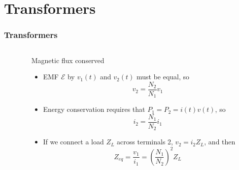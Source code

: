\documentclass[beamer]{standalone}
\begin{document}
\section{Transformers}
\begin{frame}
 \frametitle{Transformers}
 \begin{columns}
  \begin{column}{0.4\textwidth}
    \\
  \end{column}
  \begin{column}{0.6\textwidth}
   \begin{block}{Magnetic flux conserved}
    \begin{itemize}
     \item EMF $\mathcal{E}$ by $v_1(t)$ and $v_2(t)$ must be equal, so
      \begin{equation*}
       v_2 = \frac{N_2}{N_1} v_1
      \end{equation*}
     \item Energy conservation requires that $P_1 = P_2 = i(t) v(t)$, so
      \begin{equation*}
       i_2 = \frac{N_1}{N_2} i_1
      \end{equation*}
     \item If we connect a load $Z_L$ across terminals 2, $v_2 = i_2 Z_L$, and then
      \begin{equation*}
       Z_{eq} = \frac{v_1}{i_1} = \left(\frac{N_1}{N_2}\right)^2 Z_L
      \end{equation*}
    \end{itemize}
   \end{block}
  \end{column}
 \end{columns}
\end{frame}
\end{document}
